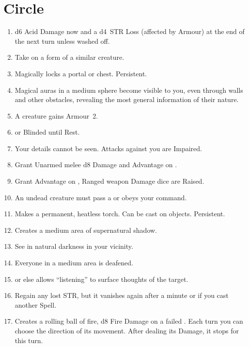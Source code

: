 \documentclass[itdr]{subfiles}
\begin{document}

\vfill
\break

\section{ Circle}
\def \spellcircle {2}
\begin{enumerate}
	\item {} d6 Acid Damage now and a d4~STR Loss (affected by Armour) at the end of the next turn unless washed off.
	\item {} Take on a form of a similar creature.
	\item {} Magically locks a portal or chest. Persistent.
	\item {} Magical auras in a medium sphere become visible to you, even through walls and other obstacles, revealing the most general information of their nature.
	\item {} A creature gains Armour~2.
	\item {}  or Blinded until Rest.
	\item {} Your details cannot be seen. Attacks against you are Impaired.
	\item {} Grant Unarmed melee d8 Damage and Advantage on .
	\item {} Grant Advantage on , Ranged weapon Damage dice are Raised.
	\item {} An undead creature must pass a  or obeys your command.
	\item {} Makes a permanent, heatless torch. Can be cast on objects. Persistent.
	\item {} Creates a medium area of supernatural shadow.
	\item {} See in natural darkness in your vicinity.
	\item {} Everyone in a medium area is deafened.
	\item {}  or else allows \mbox{``listening''} to surface thoughts of the target.
	\item {} Regain any lost STR, but it vanishes again after a minute or if you cast another Spell.
	\item {} Creates a rolling ball of fire, d8 Fire Damage on a failed . Each turn you can choose the direction of its movement. After dealing its Damage, it stops for this turn.

\end{enumerate}
\end{document}

